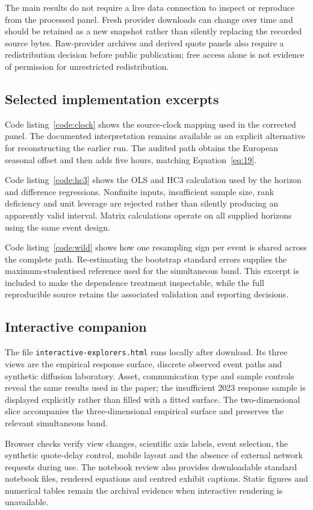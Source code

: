 The main results do not require a live data connection to inspect or reproduce from the processed panel. Fresh provider downloads can change over time and should be retained as a new snapshot rather than silently replacing the recorded source bytes. Raw-provider archives and derived quote panels also require a redistribution decision before public publication; free access alone is not evidence of permission for unrestricted redistribution.

\subsection{Selected implementation excerpts}
Code listing~\ref{code:clock} shows the source-clock mapping used in the corrected panel. The documented interpretation remains available as an explicit alternative for reconstructing the earlier run. The audited path obtains the European seasonal offset and then adds five hours, matching Equation~\ref{eq:19}.


Code listing~\ref{code:hc3} shows the OLS and HC3 calculation used by the horizon and difference regressions. Nonfinite inputs, insufficient sample size, rank deficiency and unit leverage are rejected rather than silently producing an apparently valid interval. Matrix calculations operate on all supplied horizons using the same event design.


Code listing~\ref{code:wild} shows how one resampling sign per event is shared across the complete path. Re-estimating the bootstrap standard errors supplies the maximum-studentised reference used for the simultaneous band. This excerpt is included to make the dependence treatment inspectable, while the full reproducible source retains the associated validation and reporting decisions.


\subsection{Interactive companion}
The file \texttt{interactive-explorers.html} runs locally after download. Its three views are the empirical response surface, discrete observed event paths and synthetic diffusion laboratory. Asset, communication type and sample controls reveal the same results used in the paper; the insufficient 2023 response sample is displayed explicitly rather than filled with a fitted surface. The two-dimensional slice accompanies the three-dimensional empirical surface and preserves the relevant simultaneous band.

Browser checks verify view changes, scientific axis labels, event selection, the synthetic quote-delay control, mobile layout and the absence of external network requests during use. The notebook review also provides downloadable standard notebook files, rendered equations and centred exhibit captions. Static figures and numerical tables remain the archival evidence when interactive rendering is unavailable.

